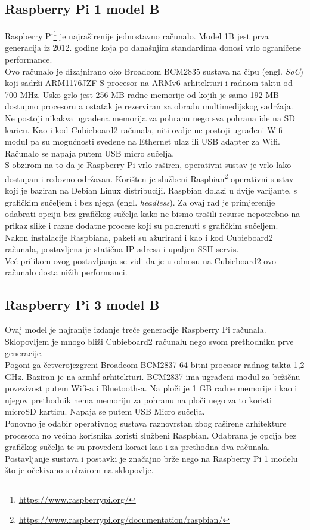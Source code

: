 \documentclass[times, utf8, zavrsni, numeric]{fer}
\begin{document}
\subsection{Raspberry Pi 1 model B}
Raspberry Pi\footnote{\url{https://www.raspberrypi.org/}} je najraširenije jednostavno računalo. Model 1B jest prva generacija iz 2012. godine koja po današnjim standardima
donosi vrlo ograničene performance. \\
Ovo računalo je dizajnirano oko Broadcom BCM2835 sustava na čipu (engl. \emph{SoC}) koji sadrži ARM1176JZF-S procesor na ARMv6
arhitekturi i radnom taktu od 700 MHz. Usko grlo jest 256 MB radne memorije od kojih je samo 192 MB dostupno procesoru a ostatak je
rezerviran za obradu multimedijskog sadržaja. Ne postoji nikakva ugrađena memorija za pohranu nego sva pohrana ide na SD karicu.
Kao i kod Cubieboard2 računala, niti ovdje ne postoji ugrađeni Wifi modul pa su mogućnosti svedene na Ethernet ulaz ili USB
adapter za Wifi. Računalo se napaja putem USB micro sučelja.\\
S obzirom na to da je Raspberry Pi vrlo raširen, operativni sustav je vrlo lako dostupan i redovno održavan. Korišten je službeni
Raspbian\footnote{\url{https://www.raspberrypi.org/documentation/raspbian/}} operativni sustav koji je baziran na Debian Linux distribuciji. Raspbian dolazi u dvije varijante, s grafičkim sučeljem
i bez njega (engl. \emph{headless}). Za ovaj rad je primjerenije odabrati opciju bez grafičkog sučelja kako ne bismo trošili
resurse nepotrebno na prikaz slike i razne dodatne procese koji su pokrenuti s grafičkim sučeljem. \\
Nakon instalacije Raspbiana, paketi su ažurirani i kao i kod Cubieboard2 računala, postavljena je statična IP adresa i upaljen SSH
servis. \\
Već prilikom ovog postavljanja se vidi da je u odnosu na Cubieboard2 ovo računalo dosta nižih performanci.
\subsection{Raspberry Pi 3 model B}
Ovaj model je najranije izdanje treće generacije Raspberry Pi računala. Sklopovljem je mnogo bliži Cubieboard2 računalu nego
svom prethodniku prve generacije. \\
Pogoni ga četverojezgreni Broadcom BCM2837 64 bitni procesor radnog takta 1,2 GHz. Baziran je na armhf arhitekturi.
BCM2837 ima ugrađeni modul za bežičnu povezivost putem Wifi-a i Bluetooth-a. Na ploči je 1 GB radne memorije i kao i njegov prethodnik
nema memoriju za pohranu na ploči nego za to koristi microSD karticu. Napaja se putem USB Micro sučelja. \\
Ponovno je odabir operativnog sustava raznovrstan zbog raširene arhitekture procesora no većina korisnika koristi službeni 
Raspbian. Odabrana je opcija bez grafičkog sučelja te su provedeni koraci kao i za prethodna dva računala. \\
Postavljanje sustava i postavki je značajno brže nego na Raspberry Pi 1 modelu što je očekivano s obzirom na sklopovlje.
\end{document}
